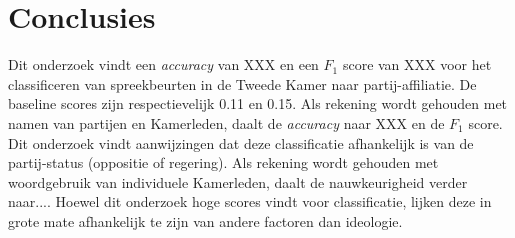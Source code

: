 \section{Conclusies}
\label{sec:conc}

Dit onderzoek vindt een \textit{accuracy} van XXX en een $F_1$ score van XXX voor het classificeren van spreekbeurten in de Tweede Kamer naar partij-affiliatie. De baseline scores zijn respectievelijk 0.11 en 0.15. Als rekening wordt gehouden met namen van partijen en Kamerleden, daalt de \textit{accuracy} naar XXX en de $F_1$ score. Dit onderzoek vindt aanwijzingen dat deze classificatie afhankelijk is van de partij-status (oppositie of regering). Als rekening wordt gehouden met woordgebruik van individuele Kamerleden, daalt de nauwkeurigheid verder naar.... Hoewel dit onderzoek hoge scores vindt voor classificatie, lijken deze in grote mate afhankelijk te zijn van andere factoren dan ideologie.